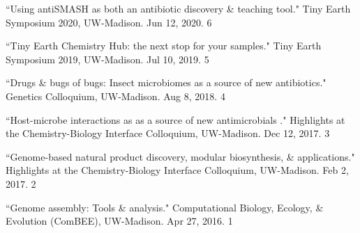 
\begin{cvpubs} 

\cvpub
{``Using antiSMASH as both an antibiotic discovery \& teaching tool." Tiny Earth Symposium 2020, UW-Madison. Jun 12, 2020.}
{6}

\cvpub
{``Tiny Earth Chemistry Hub: the next stop for your samples." Tiny Earth Symposium 2019, UW-Madison. Jul 10, 2019.}
{5}

\cvpub
{``Drugs \& bugs of bugs: Insect microbiomes as a source of new antibiotics." Genetics Colloquium, UW-Madison. Aug 8, 2018.}
{4}

\cvpub
{``Host-microbe interactions as as a source of new antimicrobials
." Highlights at the Chemistry-Biology Interface Colloquium, UW-Madison. Dec 12, 2017.}
{3}

\cvpub
{``Genome-based natural product discovery, modular biosynthesis, \& applications." Highlights at the Chemistry-Biology Interface Colloquium, UW-Madison. Feb 2, 2017.}
{2}

\cvpub
{``Genome assembly: Tools \& analysis." Computational Biology, Ecology, \& Evolution (ComBEE), UW-Madison. Apr 27, 2016.}
{1}

\end{cvpubs}


